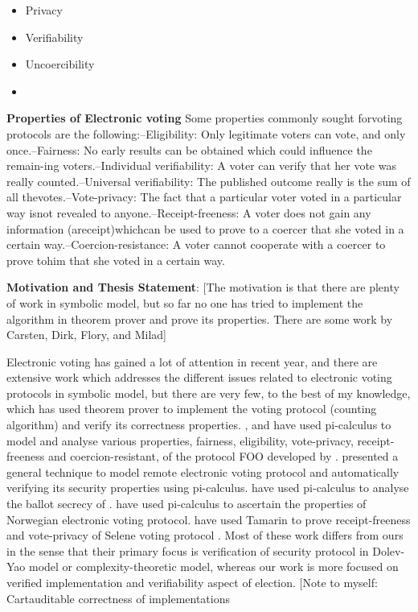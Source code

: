  \begin{itemize}
 \item Privacy 
 \item Verifiability
 \item Uncoercibility
 \item 
 \end{itemize} 

\textbf{Properties of Electronic voting} 
 Some properties commonly sought forvoting protocols are the following:–Eligibility: Only legitimate voters can vote, and only once.–Fairness: No early results can be obtained which could influence the remain-ing voters.–Individual verifiability: A voter can verify that her vote was really counted.–Universal verifiability: The published outcome really is the sum of all thevotes.–Vote-privacy: The fact that a particular voter voted in a particular way isnot revealed to anyone.–Receipt-freeness: A voter does not gain any information (areceipt)whichcan be used to prove to a coercer that she voted in a certain way.–Coercion-resistance: A voter cannot cooperate with a coercer to prove tohim that she voted in a certain way.
 
 
 \textbf{Motivation and Thesis Statement}:
 [The motivation is that there are plenty of work in symbolic model, but so far no one has 
  tried to implement the algorithm in theorem prover and prove its properties. There are some 
  work by Carsten, Dirk, Flory, and Milad]
  
 Electronic voting has gained a lot of attention in recent year,  and  there are extensive work which 
 addresses the different issues related to electronic voting protocols  in symbolic model, 
 but there are very few, to the best of my knowledge, 
 which has used theorem prover to implement the voting protocol (counting algorithm)
 and verify its correctness properties. 
 \cite{10.1007/978-3-540-31987-0_14}, and  \cite{Delaune2010} have used pi-calculus to model 
 and analyse various properties, fairness, eligibility, vote-privacy, receipt-freeness and coercion-resistant,  
 of the protocol FOO developed by \cite{10.1007/3-540-57220-1_66}.  \cite{Backes:2008:AVR:1380848.1381255}
 presented a general technique to model  remote electronic 
 voting protocol and automatically verifying  its security properties using pi-calculus. 
 \cite{5992139} have used pi-calculus to analyse the ballot secrecy of \cite{Helios:2016:HVS}.
 \cite{10.1007/978-3-642-28641-4_7} have used pi-calculus to ascertain the properties of 
 Norwegian electronic voting protocol.
 \cite{10.1007/978-3-319-68687-5_7} have used Tamarin  to prove receipt-freeness 
 and vote-privacy of Selene voting protocol \citep{Selene}.  Most of these work differs from ours
 in the sense that their primary focus is verification of security protocol in  
 Dolev-Yao model or  complexity-theoretic model, whereas our work is 
 more focused on verified implementation and  verifiability  aspect of election.
[Note to myself: Cartauditable correctness of implementations
 
